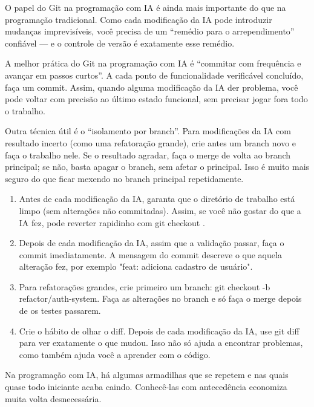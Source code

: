 
O papel do Git na programação com IA é ainda mais importante do que na programação tradicional. Como cada modificação da IA pode introduzir mudanças imprevisíveis, você precisa de um “remédio para o arrependimento” confiável — e o controle de versão é exatamente esse remédio.

A melhor prática do Git na programação com IA é “commitar com frequência e avançar em passos curtos”. A cada ponto de funcionalidade verificável concluído, faça um commit. Assim, quando alguma modificação da IA der problema, você pode voltar com precisão ao último estado funcional, sem precisar jogar fora todo o trabalho.

Outra técnica útil é o “isolamento por branch”. Para modificações da IA com resultado incerto (como uma refatoração grande), crie antes um branch novo e faça o trabalho nele. Se o resultado agradar, faça o merge de volta ao branch principal; se não, basta apagar o branch, sem afetar o principal. Isso é muito mais seguro do que ficar mexendo no branch principal repetidamente.

\begin{enumerate}
  \item Antes de cada modificação da IA, garanta que o diretório de trabalho está limpo (sem alterações não commitadas). Assim, se você não gostar do que a IA fez, pode reverter rapidinho com git checkout .
  \item Depois de cada modificação da IA, assim que a validação passar, faça o commit imediatamente. A mensagem do commit descreve o que aquela alteração fez, por exemplo "feat: adiciona cadastro de usuário".
  \item Para refatorações grandes, crie primeiro um branch: git checkout -b refactor/auth-system. Faça as alterações no branch e só faça o merge depois de os testes passarem.
  \item Crie o hábito de olhar o diff. Depois de cada modificação da IA, use git diff para ver exatamente o que mudou. Isso não só ajuda a encontrar problemas, como também ajuda você a aprender com o código.
\end{enumerate}


Na programação com IA, há algumas armadilhas que se repetem e nas quais quase todo iniciante acaba caindo. Conhecê-las com antecedência economiza muita volta desnecessária.

